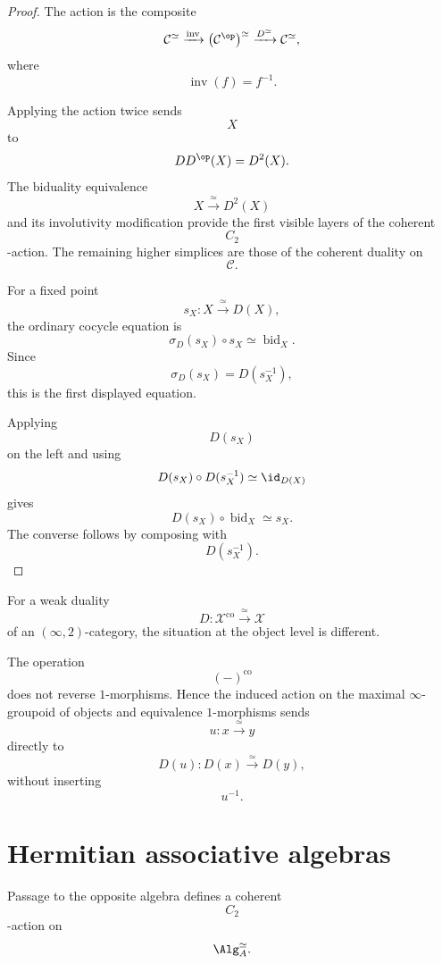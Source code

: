 \begin{proof}
The action is the composite
\[
    \mathcal C^\simeq
    \xrightarrow{\operatorname{inv}}
    \bigl(
        \mathcal C^{\op}
    \bigr)^\simeq
    \xrightarrow{D^\simeq}
    \mathcal C^\simeq,
\]
where
\[
    \operatorname{inv}(f)=f^{-1}.
\]

Applying the action twice sends
\[
    X
\]
to
\[
    DD^{\op}(X)=D^2(X).
\]
The biduality equivalence
\[
    X
    \xrightarrow{\;\simeq\;}
    D^2(X)
\]
and its involutivity modification provide the first visible layers of
the coherent
\[
    C_2
\]
-action. The remaining higher simplices are those of the coherent
duality on
\[
    \mathcal C.
\]

For a fixed point
\[
    s_X
    \colon
    X
    \xrightarrow{\;\simeq\;}
    D(X),
\]
the ordinary cocycle equation is
\[
    \sigma_D(s_X)\circ s_X
    \simeq
    \operatorname{bid}_X.
\]
Since
\[
    \sigma_D(s_X)
    =
    D(s_X^{-1}),
\]
this is the first displayed equation.

Applying
\[
    D(s_X)
\]
on the left and using
\[
    D(s_X)\circ D(s_X^{-1})
    \simeq
    \id_{D(X)}
\]
gives
\[
    D(s_X)\circ\operatorname{bid}_X
    \simeq
    s_X.
\]
The converse follows by composing with
\[
    D(s_X^{-1}).
\]
\end{proof}

\begin{remark}
\label{rem:weak-duality-object-core-action}
For a weak duality
\[
    D
    \colon
    \mathcal X^{\mathrm{co}}
    \xrightarrow{\;\simeq\;}
    \mathcal X
\]
of an $(\infty,2)$-category, the situation at the object level is
different.

The operation
\[
    (-)^{\mathrm{co}}
\]
does not reverse $1$-morphisms. Hence the induced action on the maximal
$\infty$-groupoid of objects and equivalence $1$-morphisms sends
\[
    u
    \colon
    x
    \xrightarrow{\;\simeq\;}
    y
\]
directly to
\[
    D(u)
    \colon
    D(x)
    \xrightarrow{\;\simeq\;}
    D(y),
\]
without inserting
\[
    u^{-1}.
\]
\end{remark}

\section{Hermitian associative algebras}
\label{sec:hermitian-associative-algebras}

Passage to the opposite algebra defines a coherent
\[
    C_2
\]
-action on
\[
    \Alg_A^\simeq.
\]

